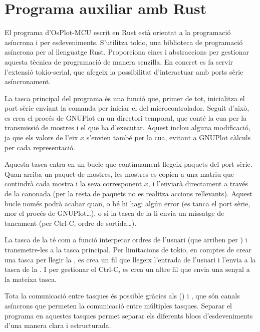 \documentclass{tfgitic}[2023/07/07]
\begin{document}
\section{Programa auxiliar amb Rust}

El programa d'OsPlot-MCU escrit en Rust està orientat a la programació
asíncrona i per esdeveniments. S'utilitza tokio, una biblioteca de
programació asíncrona per al llenguatge Rust. Proporciona eines i
abstraccions per gestionar aquesta tècnica de programació de manera
senzilla. En concret es fa servir l'extensió tokio-serial, que afegeix
la possibilitat d'interactuar amb ports sèrie asíncronament.

\newpage

La tasca principal del programa és una funció que, primer de tot,
inicialitza el port sèrie enviant la comanda per iniciar el
 del microcontrolador. Seguit d'això, es crea el procés
de GNUPlot en un directori temporal, que conté la cua per la
transmissió de mostres i el  que ha d'executar. Aquest
 inclou alguna modificació, ja que els valors de l'eix $x$
s'envien també per la cua, evitant a GNUPlot càlculs per cada
representació.

Aquesta tasca entra en un bucle que contínuament llegeix paquets del
port sèrie. Quan arriba un paquet de mostres, les mostres es copien a
una matriu que contindrà cada mostra i la seva corresponent $x$, i
l'enviarà directament a través de la canonada (per la resta de
paquets no es realitza accions rellevants). Aquest bucle només podrà
acabar quan, o bé hi hagi algún error (es tanca el port sèrie, mor
el procés de GNUPlot\dots), o si la tasca de la  li envia
un missatge de tancament (per Ctrl-C, ordre de sortida\dots).

La tasca de la  té com a funció interpetar ordres de
l'usuari (que arriben per ) i transmetre-les a la tasca
principal.  Per limitacions de tokio, en comptes de crear una tasca
per llegir la , es crea un fil que llegeix l'entrada de
l'usuari i l'envia a la tasca de la . I per gestionar el
Ctrl-C, es crea un altre fil que envia una senyal a la mateixa tasca.

Tota la comunicació entre tasques és possible gràcies als 
() i , que són
canals asíncrons que permeten la comunicació entre múltiples
tasques. Separar el programa en aquestes tasques permet separar els
diferents blocs d'esdeveniments d'una manera clara i estructurada.
\end{document}
